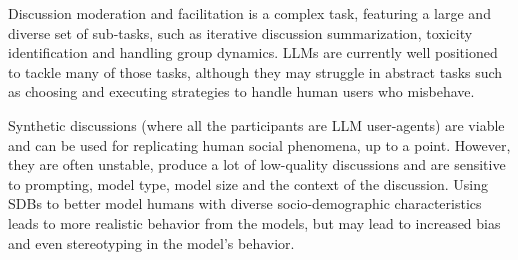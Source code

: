Discussion moderation and facilitation is a complex task, featuring a large and diverse set of sub-tasks, such as iterative discussion summarization, toxicity identification and handling group dynamics. LLMs are currently well positioned to tackle many of those tasks, although they may struggle in abstract tasks such as choosing and executing strategies to handle human users who misbehave.

Synthetic discussions (where all the participants are LLM user-agents) are viable and can be used for replicating human social phenomena, up to a point. However, they are often unstable, produce a lot of low-quality discussions and are sensitive to prompting, model type, model size and the context of the discussion. Using \acp{SDB} to better model humans with diverse socio-demographic characteristics leads to more realistic behavior from the models, but may lead to increased bias and even stereotyping in the model's behavior.
